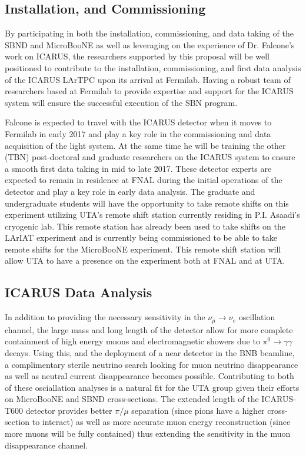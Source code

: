 \subsection{Installation, and Commissioning}\label{sec:ICARUSBulid}
By participating in both the installation, commissioning, and data taking of the SBND and MicroBooNE as well as leveraging on the experience of Dr. Falcone's work on ICARUS, the researchers supported by this proposal will be well positioned to contribute to the installation, commissioning, and first data analysis of the ICARUS LArTPC upon its arrival at Fermilab. Having a robust team of researchers based at Fermilab to provide expertise and support for the ICARUS system will ensure the successful execution of the SBN program.

Falcone is expected to travel with the ICARUS detector when it moves to Fermilab in early 2017 and play a key role in the commissioning and data acquisition of the light system. At the same time he will be training the other (TBN) post-doctoral and graduate researchers on the ICARUS system to ensure a smooth first data taking in mid to late 2017. These detector experts are expected to remain in residence at FNAL during the initial operations of the detector and play a key role in early data analysis. The graduate and undergraduate students will have the opportunity to take remote shifts on this experiment utilizing UTA's remote shift station currently residing in P.I. Asaadi's cryogenic lab. This remote station has already been used to take shifts on the LArIAT experiment and is currently being commissioned to be able to take remote shifts for the MicroBooNE experiment. This remote shift station will allow UTA to have a presence on the experiment both at FNAL and at UTA.

\subsection{ICARUS Data Analysis}\label{sec:ICARUSDataAnalysis}
In addition to providing the necessary sensitivity in the $\nu_{\mu} \rightarrow \nu_{e}$ oscillation channel, the large mass and long length of the detector allow for more complete containment of high energy muons and electromagnetic showers due to $\pi^{0} \rightarrow \gamma \gamma$ decays. Using this, and the deployment of a near detector in the BNB beamline, a complimentary sterile neutrino search looking for muon neutrino disappearance as well as neutral current disappearance becomes possible. Contributing to both of these osciallation analyses is a natural fit for the UTA group given their efforts on MicroBooNE and SBND cross-sections. The extended length of the ICARUS-T600 detector provides better $\pi / \mu$ separation (since pions have a higher cross-section to interact) as well as more accurate muon energy reconstruction (since more muons will be fully contained) thus extending the sensitivity in the muon disappearance channel. 

